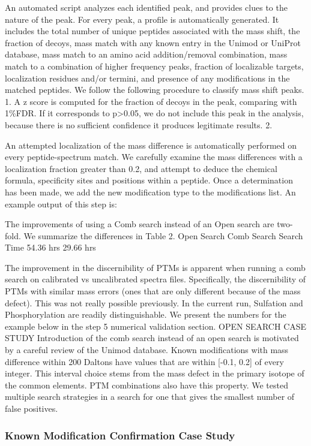 \documentclass[journal=jprobs,manuscript=article]{achemso}
\begin{document}
An automated script analyzes each identified peak, and provides clues to the nature of the peak. For every peak, a profile is automatically generated. It includes the total number of unique peptides associated with the mass shift, the fraction of decoys, mass match with any known entry in the Unimod or UniProt database, mass match to an amino acid addition/removal combination, mass match to a combination of higher frequency peaks, fraction of localizable targets, localization residues and/or termini, and presence of any modifications in the matched peptides. We follow the following procedure to classify mass shift peaks. 
1.	A z score is computed for the fraction of decoys in the peak, comparing with 1\%FDR. If it corresponds to p>0.05, we do not include this peak in the analysis, because there is no sufficient confidence it produces legitimate results.
2.	

An attempted localization of the mass difference is automatically performed on every peptide-spectrum match. We carefully examine the mass differences with a localization fraction greater than 0.2, and attempt to deduce the chemical formula, specificity sites and positions within a peptide. Once a determination has been made, we add the new modification type to the modifications list.
An example output of this step is:
 

The improvements of using a Comb search instead of an Open search are two-fold. We summarize the differences in Table 2.
	Open Search	Comb Search
Search Time	54.36 hrs	29.66 hrs
 
The improvement in the discernibility of PTMs is apparent when running a comb search on calibrated vs uncalibrated spectra files. Specifically, the discernibility of PTMs with similar mass errors (ones that are only different because of the mass defect). This was not really possible previously. In the current run, Sulfation and Phosphorylation are readily distinguishable. We present the numbers for the example below in the step 5 numerical validation section.
OPEN SEARCH CASE STUDY
Introduction of the comb search instead of an open search is motivated by a careful review of the Unimod database. Known modifications with mass difference within 200 Daltons have values that are within [-0.1, 0.2] of every integer. This interval choice stems from the mass defect in the primary isotope of the common elements. PTM combinations also have this property.
We tested multiple search strategies in a search for one that gives the smallest number of false positives. 
\subsubsection{Known Modification Confirmation Case Study}
\end{document}
